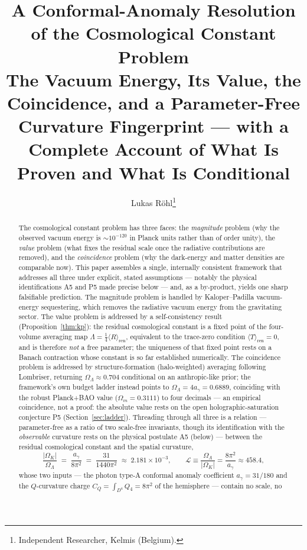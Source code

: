 \documentclass[11pt,a4paper]{article}
\title{\bfseries A Conformal-Anomaly Resolution of the Cosmological Constant Problem\\[0.4em]
\large The Vacuum Energy, Its Value, the Coincidence, and a Parameter-Free
Curvature Fingerprint --- with a Complete Account of What Is Proven and What Is Conditional}
\author{Lukas R\"ohl\thanks{Independent Researcher, Kelmis (Belgium).}}
\date{}
\theoremstyle{plain}
\theoremstyle{definition}
\theoremstyle{remark}
\newcommand{\Ok}{\Omega_K}
\newcommand{\OL}{\Omega_\Lambda}
\newcommand{\Om}{\Omega_m}
\newcommand{\ag}{a_\gamma}
\newcommand{\CQ}{C_Q}
\newcommand{\Lb}{\mathcal{L}}
\newcommand{\avg}[1]{\langle #1 \rangle}
\begin{document}
\maketitle

\begin{abstract}
\noindent
The cosmological constant problem has three faces: the \emph{magnitude} problem (why the
observed vacuum energy is $\sim 10^{-120}$ in Planck units rather than of order unity), the
\emph{value} problem (what fixes the residual scale once the radiative contributions are
removed), and the \emph{coincidence} problem (why the dark-energy and matter densities are
comparable now). This paper assembles a single, internally consistent framework that addresses
all three under explicit, stated assumptions --- notably the physical identifications A5 and P5
made precise below --- and, as a by-product, yields one sharp falsifiable prediction. The magnitude problem
is handled by Kaloper--Padilla vacuum-energy sequestering, which removes the radiative vacuum
energy from the gravitating sector. The value problem is addressed by a self-consistency
result (Proposition~\ref{thm:kp}): the residual cosmological constant is a fixed point of
the four-volume averaging map $\Lambda = \tfrac14\avg{R}_{\mathrm{ren}}$, equivalent to the
trace-zero condition $\avg{T}_{\mathrm{ren}} = 0$, and is therefore \emph{not} a free
parameter; the uniqueness of that fixed point rests on a Banach contraction whose constant is so
far established numerically. The coincidence problem is addressed by structure-formation (halo-weighted)
averaging following Lombriser, returning $\OL \approx 0.704$ conditional on an anthropic-like
prior; the framework's own budget ladder instead points to $\OL = 4\ag = 0.6889$,
coinciding with the robust Planck+BAO value ($\Om = 0.3111$) to four decimals --- an empirical
coincidence, not a proof: the absolute value rests on the open holographic-saturation conjecture
P5 (Section~\ref{sec:ladder}). Threading through all three is a relation --- parameter-free as a
ratio of two scale-free invariants, though its identification with the \emph{observable} curvature
rests on the physical postulate A5 (below) --- between the residual cosmological constant and the
spatial curvature,
\[
\frac{|\Ok|}{\OL} \;=\; \frac{\ag}{8\pi^2} \;=\; \frac{31}{1440\pi^2} \;\approx\; 2.181\times 10^{-3},
\qquad
\Lb \equiv \frac{\OL}{|\Ok|} = \frac{8\pi^2}{\ag} \approx 458.4,
\]
whose two inputs --- the photon type-A conformal anomaly coefficient $\ag = 31/180$ and the
$Q$-curvature charge $\CQ = \int_{D^4} Q_4 = 8\pi^2$ of the hemisphere --- contain no scale, no

\end{abstract}
\end{document}
